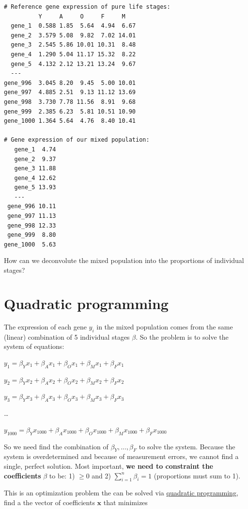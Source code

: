 \documentclass[11pt, fleqn]{article}
\begin{document}
\begin{Verbatim}[formatcom=\color{violet}, fontsize=\small]
# Reference gene expression of pure life stages:
          Y     A     O     F     M
  gene_1  0.588 1.85  5.64  4.94  6.67
  gene_2  3.579 5.08  9.82  7.02 14.01
  gene_3  2.545 5.86 10.01 10.31  8.48
  gene_4  1.290 5.04 11.17 15.32  8.22
  gene_5  4.132 2.12 13.21 13.24  9.67
  ---                                    
gene_996  3.045 8.20  9.45  5.00 10.01
gene_997  4.885 2.51  9.13 11.12 13.69
gene_998  3.730 7.78 11.56  8.91  9.68
gene_999  2.385 6.23  5.81 10.51 10.90
gene_1000 1.364 5.64  4.76  8.40 10.41

# Gene expression of our mixed population:
   gene_1  4.74
   gene_2  9.37
   gene_3 11.88
   gene_4 12.62
   gene_5 13.93
   ---          
 gene_996 10.11
 gene_997 11.13
 gene_998 12.33
 gene_999  8.80
gene_1000  5.63
\end{Verbatim}

How can we deconvolute the mixed population into the proportions of individual stages?

\section{Quadratic programming}

The expression of each gene $y_{i}$ in the mixed population comes from the same (linear) combination of 5 individual stages $\beta$. So the problem is to solve the system of equations:

$y_{1} = \beta_{Y} x_{1} + \beta_{A} x_{1} + \beta_{O} x_{1} + \beta_{M} x_{1} + \beta_{F} x_{1}$

$y_{2} = \beta_{Y} x_{2} + \beta_{A} x_{2} + \beta_{O} x_{2} + \beta_{M} x_{2} + \beta_{F} x_{2}$

$y_{3} = \beta_{Y} x_{3} + \beta_{A} x_{3} + \beta_{O} x_{3} + \beta_{M} x_{3} + \beta_{F} x_{3}$

\dots

$y_{1000} = \beta_{Y} x_{1000} + \beta_{A} x_{1000} + \beta_{O} x_{1000} + \beta_{M} x_{1000} + \beta_{F} x_{1000}$

So we need find the combination of $\beta_{Y}, ..., \beta_{F}$ to solve the
system. Because the system is overdetermined and because of measurement errors,
we cannot find a single, perfect solution. Most important, \textbf{we need to
constraint the coefficients} $\beta$ to be: 1) $\geq 0$ and 2) $\sum_{i=1}^{n}
\beta_{i} = 1$ (proportions must sum to 1).

This is an optimization problem the can be solved via 
\href{https://en.wikipedia.org/wiki/Quadratic_programming}{quadratic
programming}, find a the vector of coefficients $\mathbf{x}$ that minimizes
\end{document}
